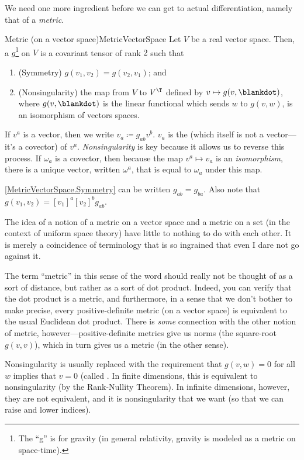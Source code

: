 We need one more ingredient before we can get to actual differentiation, namely that of a \emph{metric}.
\begin{dfn}{Metric (on a vector space)}{MetricVectorSpace}
Let $V$ be a real vector space.  Then, a  $g$\footnote{The ``g'' is for gravity (in general relativity, gravity is modeled as a metric on space-time).} on $V$ is a covariant tensor of rank $2$ such that
\begin{enumerate}
\item \label{MetricVectorSpace.Symmetry}(Symmetry) $g(v_1,v_2)=g(v_2,v_1)$; and
\item \label{MetricVectorSpace.Nonsingularity}(Nonsingularity) the map from $V$ to $V^{\T}$ defined by $v\mapsto g(v,\blankdot )$, where $g(v,\blankdot )$ is the linear functional which sends $w$ to $g(v,w)$, is an isomorphism of vectors spaces.
\end{enumerate}
\begin{rmk}
If $v^a$ is a vector, then we write $v_a\coloneqq g_{ab}v^b$.  $v_a$ is the  (which itself is not a vector---it's a covector) of $v^a$.  \emph{Nonsingularity} is key because it allows us to reverse this process.  If $\omega _a$ is a covector, then because the map $v^a\mapsto v_a$ is an \emph{isomorphism}, there is a unique vector, written $\omega ^a$, that is equal to $\omega _a$ under this map.
\end{rmk}
\begin{rmk}
\cref{MetricVectorSpace.Symmetry} can be written $g_{ab}=g_{ba}$.  Also note that $g(v_1,v_2)=[v_1]^a[v_2]^bg_{ab}$.
\end{rmk}
\begin{rmk}
The idea of a notion of a metric on a vector space and a metric on a set (in the context of uniform space theory) have little to nothing to do with each other.  It is merely a coincidence of terminology that is so ingrained that even I dare not go against it.
\end{rmk}
\begin{rmk}
The term ``metric'' in this sense of the word should really not be thought of as a sort of distance, but rather as a sort of dot product.  Indeed, you can verify that the dot product is a metric, and furthermore, in a sense that we don't bother to make precise, every positive-definite metric (on a vector space) is equivalent to the usual Euclidean dot product.  There is \emph{some} connection with the other notion of metric, however---positive-definite metrics give us norms (the square-root $g(v,v)$), which in turn gives us a metric (in the other sense).
\end{rmk}
\begin{rmk}
Nonsingularity is usually replaced with the requirement that $g(v,w)=0$ for all $w$ implies that $v=0$ (called .  In finite dimensions, this is equivalent to nonsingularity (by the Rank-Nullity Theorem).  In infinite dimensions, however, they are not equivalent, and it is nonsingularity that we want (so that we can raise and lower indices).
\end{rmk}
\end{dfn}
